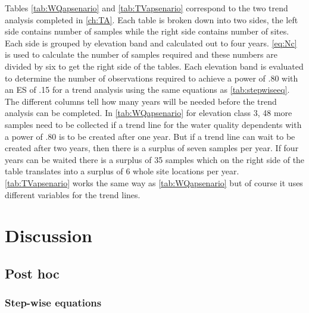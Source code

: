 
Tables \autoref{tab:WQapsenario} and \autoref{tab:TVapsenario} correspond to the two trend analysis completed in \autoref{ch:TA}.
Each table is  broken down into two sides, the left side contains number of samples while the right side contains number of sites.
Each side is grouped by elevation band and calculated out to four years.
\autoref{eq:Nc} is used to calculate the number of samples required and these numbers are divided by six to get the right side of the tables.
Each elevation band is evaluated to determine the number of observations required to achieve a power of .80 with an ES of .15 for a trend analysis using the same equations as \autoref{tab:stepwiseeq}.
The different columns tell how many years will be needed before the trend analysis can be completed.
In \autoref{tab:WQapsenario} for elevation class 3, 48 more samples need to be collected if a trend line for the water quality dependents with a power of .80 is to be created after one year.  
But if a trend line can wait to be created after two years, then there is a surplus of seven samples per year.  
If four years can be waited there is a surplus of 35 samples which on the right side of the table translates into a surplus of 6 whole site locations per year.
\autoref{tab:TVapsenario} works the same way as \autoref{tab:WQapsenario} but of course it uses different variables for the trend lines.

\section{Discussion}

\subsection{Post hoc}

\subsubsection{Step-wise equations}

